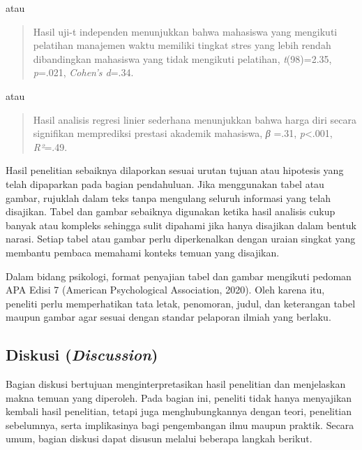 \documentclass[
  indonesian,
  letterpaper,
  DIV=11,
  numbers=noendperiod]{scrreprt}
\begin{document}
atau

\begin{quote}
Hasil uji-t independen menunjukkan bahwa mahasiswa yang mengikuti
pelatihan manajemen waktu memiliki tingkat stres yang lebih rendah
dibandingkan mahasiswa yang tidak mengikuti pelatihan,
\emph{t}(98)=2.35, \emph{p}=.021, \emph{Cohen's d}=.34.
\end{quote}

atau

\begin{quote}
Hasil analisis regresi linier sederhana menunjukkan bahwa harga diri
secara signifikan memprediksi prestasi akademik mahasiswa, \emph{β}
=.31, \emph{p}\textless.001, \emph{R²}=.49.
\end{quote}

Hasil penelitian sebaiknya dilaporkan sesuai urutan tujuan atau
hipotesis yang telah dipaparkan pada bagian pendahuluan. Jika
menggunakan tabel atau gambar, rujuklah dalam teks tanpa mengulang
seluruh informasi yang telah disajikan. Tabel dan gambar sebaiknya
digunakan ketika hasil analisis cukup banyak atau kompleks sehingga
sulit dipahami jika hanya disajikan dalam bentuk narasi. Setiap tabel
atau gambar perlu diperkenalkan dengan uraian singkat yang membantu
pembaca memahami konteks temuan yang disajikan.

Dalam bidang psikologi, format penyajian tabel dan gambar mengikuti
pedoman APA Edisi 7 (American Psychological Association, 2020). Oleh
karena itu, peneliti perlu memperhatikan tata letak, penomoran, judul,
dan keterangan tabel maupun gambar agar sesuai dengan standar pelaporan
ilmiah yang berlaku.

\subsection{\texorpdfstring{Diskusi
(\emph{Discussion})}{Diskusi (Discussion)}}\label{diskusi-discussion}

Bagian diskusi bertujuan menginterpretasikan hasil penelitian dan
menjelaskan makna temuan yang diperoleh. Pada bagian ini, peneliti tidak
hanya menyajikan kembali hasil penelitian, tetapi juga menghubungkannya
dengan teori, penelitian sebelumnya, serta implikasinya bagi
pengembangan ilmu maupun praktik. Secara umum, bagian diskusi dapat
disusun melalui beberapa langkah berikut.
\end{document}
